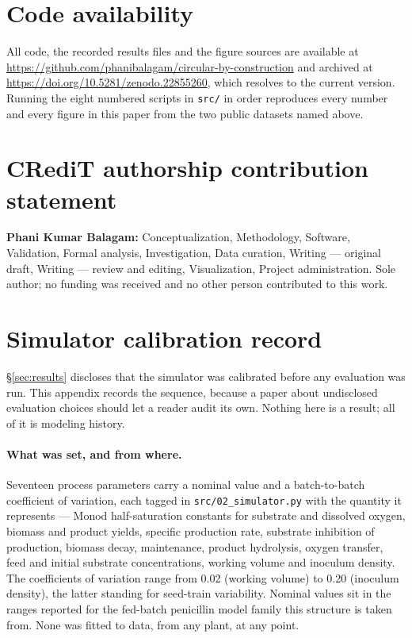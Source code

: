 \documentclass[11pt]{article}
\begin{document}
\section*{Code availability}

All code, the recorded results files and the figure sources are available at
\url{https://github.com/phanibalagam/circular-by-construction} and archived at
\url{https://doi.org/10.5281/zenodo.22855260}, which resolves to the current
version. Running the eight numbered scripts in \texttt{src/} in order reproduces
every number and every figure in this paper from the two public datasets named
above.

\section*{CRediT authorship contribution statement}

\textbf{Phani Kumar Balagam:} Conceptualization, Methodology, Software,
Validation, Formal analysis, Investigation, Data curation, Writing --- original
draft, Writing --- review and editing, Visualization, Project administration.
Sole author; no funding was received and no other person contributed to this
work.

\appendix

\section{Simulator calibration record}
\label{app:calibration}

\S\ref{sec:results} discloses that the simulator was calibrated before any
evaluation was run. This appendix records the sequence, because a paper about
undisclosed evaluation choices should let a reader audit its own. Nothing here is
a result; all of it is modeling history.

\paragraph{What was set, and from where.} Seventeen process parameters carry a
nominal value and a batch-to-batch coefficient of variation, each tagged in
\texttt{src/02\_simulator.py} with the quantity it represents --- Monod
half-saturation constants for substrate and dissolved oxygen, biomass and product
yields, specific production rate, substrate inhibition of production, biomass
decay, maintenance, product hydrolysis, oxygen transfer, feed and initial
substrate concentrations, working volume and inoculum density. The coefficients
of variation range from 0.02 (working volume) to 0.20 (inoculum density), the
latter standing for seed-train variability. Nominal values sit in the ranges
reported for the fed-batch penicillin model family this structure is taken from.
None was fitted to data, from any plant, at any point.
\end{document}
